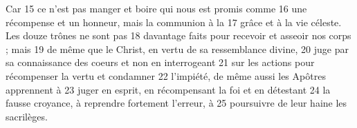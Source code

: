 Car	 
15	 	ce n'est pas manger et boire qui nous est promis comme	 
16	 	une récompense et un honneur, mais la communion à la	 
17	 	grâce et à la vie céleste. Les douze trônes ne sont pas	 
18	 	davantage faits pour recevoir et asseoir nos corps ; mais	 
19	 	de même que le Christ, en vertu de sa ressemblance divine,	 
20	 	juge par sa connaissance des coeurs et non en interrogeant	 
21	 	sur les actions pour récompenser la vertu et condamner	 
22	 	l'impiété, de même aussi les Apôtres apprennent à	 
23	 	juger en esprit, en récompensant la foi et en détestant	 
24	 	la fausse croyance, à reprendre fortement l'erreur, à	 
25	 	poursuivre de leur haine les sacrilèges.